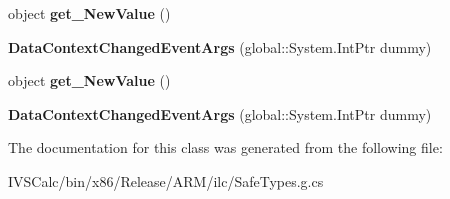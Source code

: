 \begin{DoxyCompactItemize}
object {\bfseries get\+\_\+\+New\+Value} ()
\item 
\mbox{\label{class_windows_1_1_u_i_1_1_xaml_1_1_data_context_changed_event_args_a403b12e99c603462d56be7948d8056d5}} 
{\bfseries Data\+Context\+Changed\+Event\+Args} (global\+::\+System.\+Int\+Ptr dummy)
\item 
\mbox{\label{class_windows_1_1_u_i_1_1_xaml_1_1_data_context_changed_event_args_abc7396314016ed96c604c129e1c28432}} 
object {\bfseries get\+\_\+\+New\+Value} ()
\item 
\mbox{\label{class_windows_1_1_u_i_1_1_xaml_1_1_data_context_changed_event_args_a403b12e99c603462d56be7948d8056d5}} 
{\bfseries Data\+Context\+Changed\+Event\+Args} (global\+::\+System.\+Int\+Ptr dummy)
\end{DoxyCompactItemize}


The documentation for this class was generated from the following file\+:\begin{DoxyCompactItemize}
\item 
I\+V\+S\+Calc/bin/x86/\+Release/\+A\+R\+M/ilc/Safe\+Types.\+g.\+cs\end{DoxyCompactItemize}
